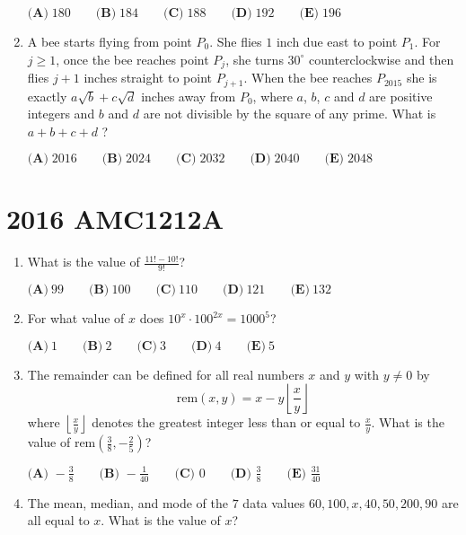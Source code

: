 \documentclass{article}
\begin{document}
\begin{enumerate}[label=\arabic*., itemsep=0.5em]
$\textbf{(A)}\; 180 \qquad\textbf{(B)}\; 184 \qquad\textbf{(C)}\; 188 \qquad\textbf{(D)}\; 192\qquad\textbf{(E)}\; 196$\par \vspace{0.5em}\item A bee starts flying from point $P_0$. She flies $1$ inch due east to point $P_1$. For $j \ge 1$, once the bee reaches point $P_j$, she turns $30^{\circ}$ counterclockwise and then flies $j+1$ inches straight to point $P_{j+1}$. When the bee reaches $P_{2015}$ she is exactly $a \sqrt{b} + c \sqrt{d}$ inches away from $P_0$, where $a$, $b$, $c$ and $d$ are positive integers and $b$ and $d$ are not divisible by the square of any prime. What is $a+b+c+d$ ?

$\textbf{(A)}\; 2016 \qquad\textbf{(B)}\; 2024 \qquad\textbf{(C)}\; 2032 \qquad\textbf{(D)}\; 2040 \qquad\textbf{(E)}\; 2048$\par \vspace{0.5em}\end{enumerate}\newpage\section*{2016 AMC1212A}\begin{enumerate}[label=\arabic*., itemsep=0.5em]\item What is the value of $\frac{11!-10!}{9!}$?

$\textbf{(A)}\ 99\qquad\textbf{(B)}\ 100\qquad\textbf{(C)}\ 110\qquad\textbf{(D)}\ 121\qquad\textbf{(E)}\ 132$\par \vspace{0.5em}\item For what value of $x$ does $10^x \cdot 100^{2x} = 1000^5$?

$\textbf{(A)}\ 1\qquad\textbf{(B)}\ 2\qquad\textbf{(C)}\ 3\qquad\textbf{(D)}\ 4\qquad\textbf{(E)}\ 5$\par \vspace{0.5em}\item The remainder can be defined for all real numbers $x$ and $y$ with $y \neq 0$ by 
\begin{equation*}
\text{rem} (x ,y)=x-y\left \lfloor \frac{x}{y} \right \rfloor
\end{equation*}
where $\left \lfloor \tfrac{x}{y} \right \rfloor$ denotes the greatest integer less than or equal to $\tfrac{x}{y}$. What is the value of $\text{rem} (\tfrac{3}{8}, -\tfrac{2}{5} )$?

$\textbf{(A) } -\frac{3}{8} \qquad \textbf{(B) } -\frac{1}{40} \qquad \textbf{(C) } 0 \qquad \textbf{(D) } \frac{3}{8} \qquad \textbf{(E) } \frac{31}{40}$\par \vspace{0.5em}\item The mean, median, and mode of the $7$ data values $60, 100, x, 40, 50, 200, 90$ are all equal to $x$. What is the value of $x$?


\end{enumerate}
\end{document}
